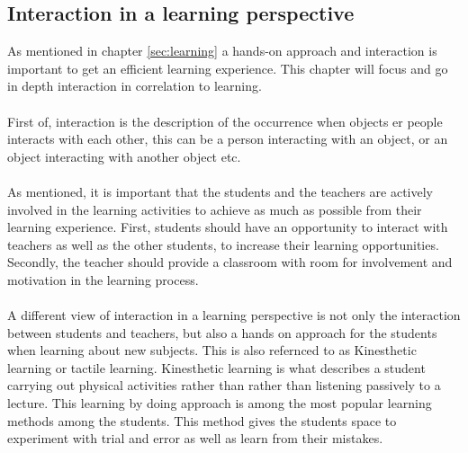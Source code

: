 \subsection{Interaction in a learning perspective}
As mentioned in chapter \ref{sec:learning} a hands-on approach and interaction is important to get an efficient learning experience. This chapter will focus and go in depth interaction in correlation to learning.\\
\\
First of, interaction is the description of the occurrence when objects er people interacts with each other, this can be a person interacting with an object, or an object interacting with another object etc.\\
\\
As mentioned, it is important that the students and the teachers are actively involved in the learning activities to achieve as much as possible from their learning experience. First, students should have an opportunity to interact with teachers as well as the other students, to increase their learning opportunities. Secondly, the teacher should provide a classroom with room for involvement and motivation in the learning process\cite{interactionlearning}.\\
\\
A different view of interaction in a learning perspective is not only the interaction between students and teachers, but also a hands on approach for the students when learning about new subjects. This is also refernced to as Kinesthetic learning or tactile learning. Kinesthetic learning is what describes a student carrying out physical activities rather than rather than listening passively to a lecture. This learning by doing approach is among the most popular learning methods among the students. This method gives the students space to experiment with trial and error as well as learn from their mistakes.\cite{kinest} \\
\\
